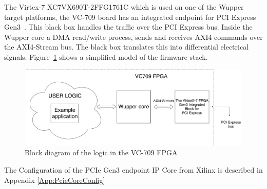 The Virtex-7 XC7VX690T-2FFG1761C which is used on one of the Wupper target platforms, the VC-709 board has an integrated endpoint for PCI Express Gen3~\cite{pg023}. This black box handles the traffic over the PCI Express bus. Inside the Wupper core a DMA read/write process, sends and receives AXI4 commands over the AXI4-Stream bus. The black box translates this into differential electrical signals. Figure~\ref{fig:pciexpressendpoint} shows a simplified model of the firmware stack. 

\begin{figure}[H]
	\centering
	\includegraphics[width = 1 \textwidth]{figures/PG023.pdf}	
	\caption{Block diagram of the logic in the VC-709 FPGA}
	\label{fig:pciexpressendpoint}
\end{figure}

The Configuration of the PCIe Gen3 endpoint IP Core from Xilinx is described in Appendix \ref{App:PcieCoreConfig}

